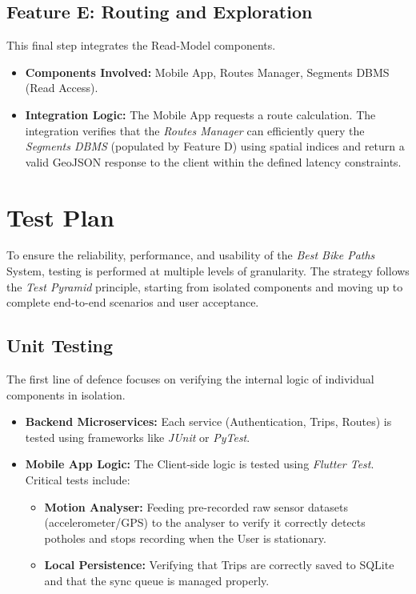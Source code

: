 \subsection*{Feature E: Routing and Exploration}
This final step integrates the Read-Model components.
\begin{itemize}
    \item \textbf{Components Involved:} Mobile App, Routes Manager, Segments DBMS (Read Access).
    \item \textbf{Integration Logic:} The Mobile App requests a route calculation. The integration verifies that the \emph{Routes Manager} can efficiently query the \emph{Segments DBMS} (populated by Feature D) using spatial indices and return a valid GeoJSON response to the client within the defined latency constraints.
\end{itemize}

\section{Test Plan}
To ensure the reliability, performance, and usability of the \emph{Best Bike Paths} System, testing is performed at multiple levels of granularity. The strategy follows the \emph{Test Pyramid} principle, starting from isolated components and moving up to complete end-to-end scenarios and user acceptance.

\subsection*{Unit Testing}
The first line of defence focuses on verifying the internal logic of individual components in isolation.
\begin{itemize}
    \item \textbf{Backend Microservices:} Each service (Authentication, Trips, Routes) is tested using frameworks like \emph{JUnit} or \emph{PyTest}. 
    \item \textbf{Mobile App Logic:} The Client-side logic is tested using \emph{Flutter Test}. Critical tests include:
    \begin{itemize}
        \item \textbf{Motion Analyser:} Feeding pre-recorded raw sensor datasets (accelerometer/GPS) to the analyser to verify it correctly detects potholes and stops recording when the User is stationary.
        \item \textbf{Local Persistence:} Verifying that Trips are correctly saved to SQLite and that the sync queue is managed properly.
    \end{itemize}
\end{itemize}

